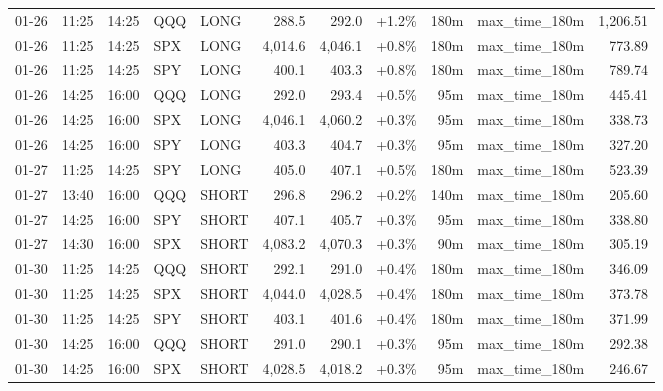\documentclass[11pt,a4paper,twoside]{article}
\begin{document}
\begin{center}
\begin{longtable}{>{\color{txtmain}}l l l l l r r r r >{\color{txtmain}}l r}
01-26 & 11:25 & 14:25 & QQQ & LONG & 288.5 & 292.0 & \textcolor{wingreen}{+1.2\%} & 180m & max\_time\_180m & \textcolor{wingreen}{1,206.51} \\
01-26 & 11:25 & 14:25 & SPX & LONG & 4,014.6 & 4,046.1 & \textcolor{wingreen}{+0.8\%} & 180m & max\_time\_180m & \textcolor{wingreen}{773.89} \\
01-26 & 11:25 & 14:25 & SPY & LONG & 400.1 & 403.3 & \textcolor{wingreen}{+0.8\%} & 180m & max\_time\_180m & \textcolor{wingreen}{789.74} \\
01-26 & 14:25 & 16:00 & QQQ & LONG & 292.0 & 293.4 & \textcolor{wingreen}{+0.5\%} & 95m & max\_time\_180m & \textcolor{wingreen}{445.41} \\
01-26 & 14:25 & 16:00 & SPX & LONG & 4,046.1 & 4,060.2 & \textcolor{wingreen}{+0.3\%} & 95m & max\_time\_180m & \textcolor{wingreen}{338.73} \\
01-26 & 14:25 & 16:00 & SPY & LONG & 403.3 & 404.7 & \textcolor{wingreen}{+0.3\%} & 95m & max\_time\_180m & \textcolor{wingreen}{327.20} \\
01-27 & 11:25 & 14:25 & SPY & LONG & 405.0 & 407.1 & \textcolor{wingreen}{+0.5\%} & 180m & max\_time\_180m & \textcolor{wingreen}{523.39} \\
01-27 & 13:40 & 16:00 & QQQ & SHORT & 296.8 & 296.2 & \textcolor{wingreen}{+0.2\%} & 140m & max\_time\_180m & \textcolor{wingreen}{205.60} \\
01-27 & 14:25 & 16:00 & SPY & SHORT & 407.1 & 405.7 & \textcolor{wingreen}{+0.3\%} & 95m & max\_time\_180m & \textcolor{wingreen}{338.80} \\
01-27 & 14:30 & 16:00 & SPX & SHORT & 4,083.2 & 4,070.3 & \textcolor{wingreen}{+0.3\%} & 90m & max\_time\_180m & \textcolor{wingreen}{305.19} \\
01-30 & 11:25 & 14:25 & QQQ & SHORT & 292.1 & 291.0 & \textcolor{wingreen}{+0.4\%} & 180m & max\_time\_180m & \textcolor{wingreen}{346.09} \\
01-30 & 11:25 & 14:25 & SPX & SHORT & 4,044.0 & 4,028.5 & \textcolor{wingreen}{+0.4\%} & 180m & max\_time\_180m & \textcolor{wingreen}{373.78} \\
01-30 & 11:25 & 14:25 & SPY & SHORT & 403.1 & 401.6 & \textcolor{wingreen}{+0.4\%} & 180m & max\_time\_180m & \textcolor{wingreen}{371.99} \\
01-30 & 14:25 & 16:00 & QQQ & SHORT & 291.0 & 290.1 & \textcolor{wingreen}{+0.3\%} & 95m & max\_time\_180m & \textcolor{wingreen}{292.38} \\
01-30 & 14:25 & 16:00 & SPX & SHORT & 4,028.5 & 4,018.2 & \textcolor{wingreen}{+0.3\%} & 95m & max\_time\_180m & \textcolor{wingreen}{246.67} \\

\end{longtable}
\end{center}
\end{document}
